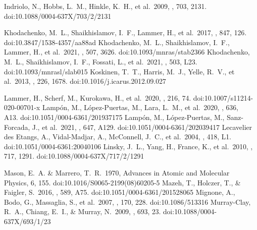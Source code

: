 \documentclass[journal, onecolumn]{aastex631}
\begin{document}
\begin{CJK*}{UTF8}{gbsn}
\begin{thebibliography}{99}
 Indriolo, N., Hobbs, L.~M., Hinkle, K.~H., et al.\ 2009, \apj, 703, 2131. doi:10.1088/0004-637X/703/2/2131



 Khodachenko, M.~L., Shaikhislamov, I.~F., Lammer, H., et al.\ 2017, \apj, 847, 126. doi:10.3847/1538-4357/aa88ad
 Khodachenko, M.~L., Shaikhislamov, I.~F., Lammer, H., et al.\ 2021, \mnras, 507, 3626. doi:10.1093/mnras/stab2366
 Khodachenko, M.~L., Shaikhislamov, I.~F., Fossati, L., et al.\ 2021, \mnras, 503, L23. doi:10.1093/mnrasl/slab015
 Koskinen, T.~T., Harris, M.~J., Yelle, R.~V., et al.\ 2013, \icarus, 226, 1678. doi:10.1016/j.icarus.2012.09.027


 Lammer, H., Scherf, M., Kurokawa, H., et al.\ 2020, \ssr, 216, 74. doi:10.1007/s11214-020-00701-x
 Lamp{\'o}n, M., L{\'o}pez-Puertas, M., Lara, L.~M., et al.\ 2020, \aap, 636, A13. doi:10.1051/0004-6361/201937175
 Lamp{\'o}n, M., L{\'o}pez-Puertas, M., Sanz-Forcada, J., et al.\ 2021, \aap, 647, A129. doi:10.1051/0004-6361/202039417
 Lecavelier des Etangs, A., Vidal-Madjar, A., McConnell, J.~C., et al.\ 2004, \aap, 418, L1. doi:10.1051/0004-6361:20040106
 Linsky, J.~L., Yang, H., France, K., et al.\ 2010, \apj, 717, 1291. doi:10.1088/0004-637X/717/2/1291


 Mason, E.~A. \& Marrero, T.~R.\ 1970, Advances in Atomic and Molecular Physics, 6, 155. doi:10.1016/S0065-2199(08)60205-5
 Mazeh, T., Holczer, T., \& Faigler, S.\ 2016, \aap, 589, A75. doi:10.1051/0004-6361/201528065
 Mignone, A., Bodo, G., Massaglia, S., et al.\ 2007, \apjs, 170, 228. doi:10.1086/513316
 Murray-Clay, R.~A., Chiang, E.~I., \& Murray, N.\ 2009, \apj, 693, 23. doi:10.1088/0004-637X/693/1/23



\end{thebibliography}
\end{CJK*}
\end{document}
